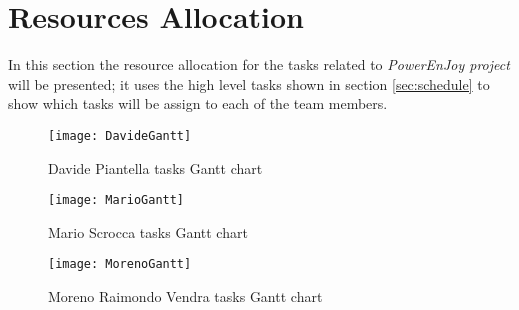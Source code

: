 \section{Resources Allocation}\label{sec:resAlloc}
In this section the resource allocation for the tasks related to \emph{PowerEnJoy project} will be presented; it uses the high level tasks shown in section \ref{sec:schedule} to show which tasks will be assign to each of the team members.

\begin{figure}[h]
	\centering
	\texttt{[image: DavideGantt]}	\caption{
		\label{fig:davideGantt} 
		Davide Piantella tasks Gantt chart
	}
	
\end{figure}\begin{figure}[h]
	\centering
	\texttt{[image: MarioGantt]}	\caption{
		\label{fig:marioGantt} 
		Mario Scrocca tasks Gantt chart
	}
	
\end{figure}\begin{figure}[h]
	\centering
	\texttt{[image: MorenoGantt]}	\caption{
		\label{fig:morenoGantt} 
		Moreno Raimondo Vendra tasks Gantt chart
	}
\end{figure}